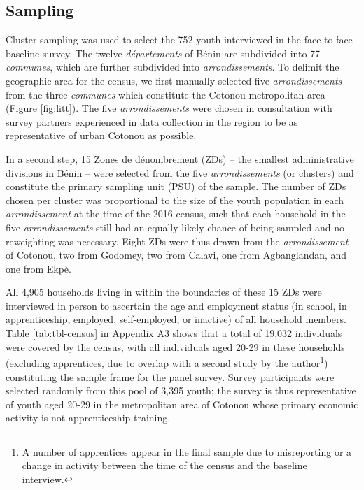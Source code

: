 \documentclass[
  a4paper, twoside, 12pt]{book}
\begin{document}
\newpage

\hypertarget{sampling}{%
\subsection*{Sampling}\label{sampling}}


Cluster sampling was used to select the 752 youth interviewed in the face-to-face baseline survey. The twelve \emph{départements} of Bénin are subdivided into 77 \emph{communes}, which are further subdivided into \emph{arrondissements}. To delimit the geographic area for the census, we first manually selected five \emph{arrondissements} from the three \emph{communes} which constitute the Cotonou metropolitan area (Figure \ref{fig:litt}). The five \emph{arrondissements} were chosen in consultation with survey partners experienced in data collection in the region to be as representative of urban Cotonou as possible.

In a second step, 15 Zones de dénombrement (ZDs) -- the smallest administrative divisions in Bénin -- were selected from the five \emph{arrondissements} (or clusters) and constitute the primary sampling unit (PSU) of the sample. The number of ZDs chosen per cluster was proportional to the size of the youth population in each \emph{arrondissement} at the time of the 2016 census, such that each household in the five \emph{arrondissements} still had an equally likely chance of being sampled and no reweighting was necessary. Eight ZDs were thus drawn from the \emph{arrondissement} of Cotonou, two from Godomey, two from Calavi, one from Agbanglandan, and one from Ekpè.

All 4,905 households living in within the boundaries of these 15 ZDs were interviewed in person to ascertain the age and employment status (in school, in apprenticeship, employed, self-employed, or inactive) of all household members. Table \ref{tab:tbl-census} in Appendix A3 shows that a total of 19,032 individuals were covered by the census, with all individuals aged 20-29 in these households (excluding apprentices, due to overlap with a second study by the author\footnote{A number of apprentices appear in the final sample due to misreporting or a change in activity between the time of the census and the baseline interview.}) constituting the sample frame for the panel survey. Survey participants were selected randomly from this pool of 3,395 youth; the survey is thus representative of youth aged 20-29 in the metropolitan area of Cotonou whose primary economic activity is not apprenticeship training.
\end{document}
